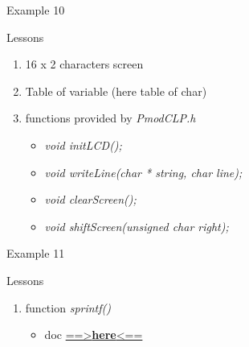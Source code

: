 \begin{frame}{Example 10}



\end{frame}

\begin{frame}{Lessons}

\begin{enumerate}
\def\labelenumi{\arabic{enumi}.}
\tightlist
\item
  16 x 2 characters screen
\item
  Table of variable (here table of char)
\item
  functions provided by \emph{PmodCLP.h}

  \begin{itemize}
  \tightlist
  \item
    \emph{void initLCD();}
  \item
    \emph{void writeLine(char * string, char line);}
  \item
    \emph{void clearScreen();}
  \item
    \emph{void shiftScreen(unsigned char right);}
  \end{itemize}
\end{enumerate}

\end{frame}

\begin{frame}{Example 11}



\end{frame}

\begin{frame}{Lessons}

\begin{enumerate}
\def\labelenumi{\arabic{enumi}.}
\tightlist
\item
  function \emph{sprintf()}

  \begin{itemize}
  \tightlist
  \item
    doc
    \href{https://www.tutorialspoint.com/c_standard_library/c_function_sprintf.htm}{==\textgreater{}\textbf{here}\textless{}==}
  \end{itemize}
\end{enumerate}

\end{frame}

